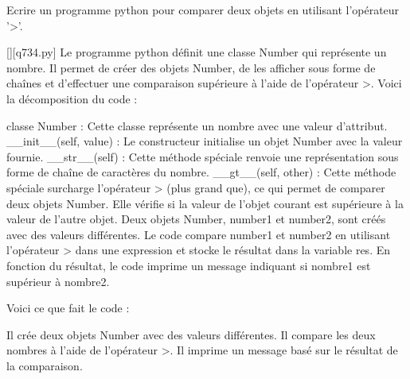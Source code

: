         \question
        Ecrire un programme python pour comparer deux objets en utilisant l'opérateur '>'.
        \par
        \begin{solution}
            \renewcommand{\nomfichier}{q734.py}
            \pythonfile{\chemincode \nomfichier}[][\nomfichier]
            Le programme python définit une classe Number qui représente un nombre. Il permet de créer des objets Number, de les afficher sous forme de chaînes et d'effectuer une comparaison supérieure à l'aide de l'opérateur >. Voici la décomposition du code :

    classe Number : Cette classe représente un nombre avec une valeur d'attribut.
    \_\_init\_\_(self, value) : Le constructeur initialise un objet Number avec la valeur fournie.
    \_\_str\_\_(self) : Cette méthode spéciale renvoie une représentation sous forme de chaîne de caractères du nombre.
    \_\_gt\_\_(self, other) : Cette méthode spéciale surcharge l'opérateur > (plus grand que), ce qui permet de comparer deux objets Number. Elle vérifie si la valeur de l'objet courant est supérieure à la valeur de l'autre objet.
    Deux objets Number, number1 et number2, sont créés avec des valeurs différentes.
    Le code compare number1 et number2 en utilisant l'opérateur > dans une expression et stocke le résultat dans la variable res.
    En fonction du résultat, le code imprime un message indiquant si nombre1 est supérieur à nombre2.

Voici ce que fait le code :

    Il crée deux objets Number avec des valeurs différentes.
    Il compare les deux nombres à l'aide de l'opérateur >.
    Il imprime un message basé sur le résultat de la comparaison.
        \end{solution}
        

